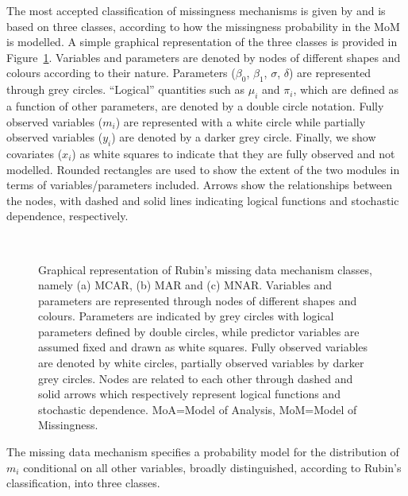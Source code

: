 \documentclass[]{article}
\begin{document}
The most accepted classification of missingness mechanisms is given by
\citep{Rubina} and is based on three classes, according to how the
missingness probability in the MoM is modelled. A simple graphical
representation of the three classes is provided in Figure~\ref{F1}. Variables
and parameters are denoted by nodes of different shapes and colours
according to their nature. Parameters (\(\beta_0\), \(\beta_1\),
\(\sigma\), \(\delta\)) are represented through grey circles.
``Logical'' quantities such as \(\mu_{i}\) and \(\pi_{i}\), which are
defined as a function of other parameters, are denoted by a double
circle notation. Fully observed variables (\(m_{i}\)) are represented
with a white circle while partially observed variables (\(y_{i}\)) are
denoted by a darker grey circle. Finally, we show covariates (\(x_{i}\))
as white squares to indicate that they are fully observed and not
modelled. Rounded rectangles are used to show the extent of the two
modules in terms of variables/parameters included. Arrows show the
relationships between the nodes, with dashed and solid lines indicating
logical functions and stochastic dependence, respectively.

\begin{figure}[H]
\centering
{}
\\
\caption{Graphical representation of Rubin's missing data mechanism classes, namely (a) MCAR, (b)
MAR and (c) MNAR. Variables and parameters are represented through nodes of different shapes and
colours. Parameters are indicated by grey circles with logical parameters defined by double circles, while predictor variables are assumed fixed and drawn as white squares. Fully observed variables are denoted by white circles, partially observed variables by darker grey circles. Nodes are related to each other through dashed and solid arrows which respectively represent logical functions and stochastic dependence. MoA=Model of Analysis, MoM=Model of Missingness.}\label{F1}
\end{figure}

The missing data mechanism specifies a probability model for the
distribution of \(m_{i}\) conditional on all other variables, broadly
distinguished, according to Rubin's classification, into three classes.
\end{document}
